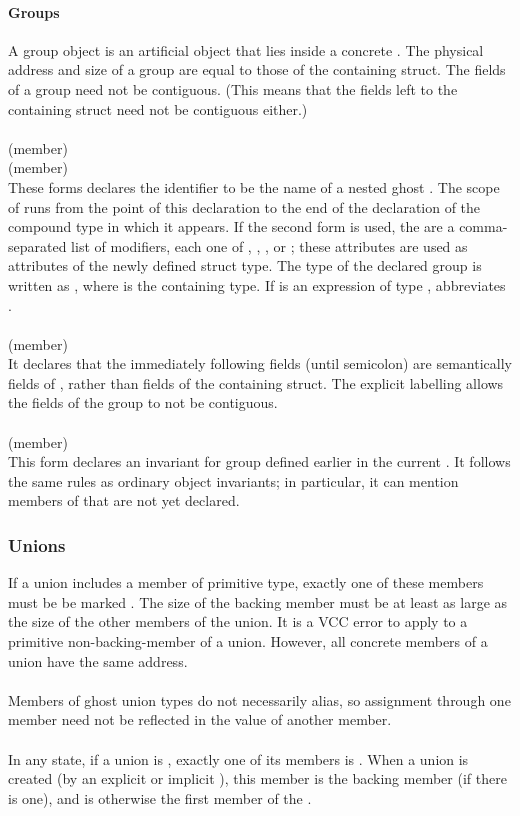 \documentclass[preprint,nocopyrightspace]{sigplanconf}
\newcommand{\subsubsubsection}[1]{\paragraph{#1}}
\begin{document}
{{{\subsubsubsection{Groups}
A group object is an artificial object that lies inside a
concrete . The physical address and size of a group
are equal to those of the containing struct. The fields of a group
need not be contiguous. (This means that the fields left to the
containing struct need not be contiguous either.)
\\\\
\noindent{} (member)\\
 (member)\\
These forms declares the identifier  to be the name of a nested
ghost . The scope of  runs from the point of this
declaration to the end of the declaration of the compound type in
which it appears.
If the second form is used,
the  are a comma-separated list of modifiers,
each one of , , ,
or ; these attributes are used as attributes of the
newly defined struct type.
The type of the declared group is written as , where 
is the containing  type. If  is an expression of
type ,  abbreviates .
\\\\
 (member)\\
It declares that the immediately
following fields (until semicolon) are semantically fields of , rather than fields of
the containing struct. The explicit labelling allows the fields of the
group to not be contiguous.
\\\\
 (member)\\
This form declares an invariant for group  defined earlier in
the current . It follows the same rules as ordinary object
invariants; in particular, it can mention members of  that are
not yet declared.

\subsubsection{Unions}
If a union includes a member of primitive type, exactly one of
these members must be be marked . The size of
the backing member must be at least as large as the size of the other
members of the union. It is a VCC error to apply \vcc{&} to a 
primitive non-backing-member of a union. However, all concrete members of a
union have the same address.
\\\\
Members of ghost union types do not necessarily alias, so assignment
through one member need not be reflected in the value of another
member.  
\\\\
In any state, if a union is \vcc{\valid}, exactly one of its members
is \vcc{\valid}. When a union is created (by an explicit or
implicit \vcc{\unblobify}), this member is the backing member (if
there is one), and is otherwise the first member of the .

}}}
\end{document}
